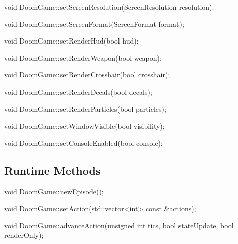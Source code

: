 \documentclass[english,bachelor,a4paper,twoside]{ppfcmthesis}
\begin{document}
\begin{clinee}
void DoomGame::setScreenResolution(ScreenResolution resolution);
\end{clinee}


\begin{clinee}
void DoomGame::setScreenFormat(ScreenFormat format);
\end{clinee}
	

\begin{clinee}       
void DoomGame::setRenderHud(bool hud);
\end{clinee}


\begin{clinee}  
void DoomGame::setRenderWeapon(bool weapon);
\end{clinee}


\begin{clinee}  
void DoomGame::setRenderCrosshair(bool crosshair);
\end{clinee}


\begin{clinee}  
void DoomGame::setRenderDecals(bool decals);
\end{clinee}


\begin{clinee}  
void DoomGame::setRenderParticles(bool particles);
\end{clinee}


\begin{clinee}
void DoomGame::setWindowVisible(bool visibility);
\end{clinee}


\begin{clinee}
void DoomGame::setConsoleEnabled(bool console);
\end{clinee}
	

\subsection{Runtime Methods}\label{subsec:runtime_methods}
	

\begin{clinee}
void DoomGame::newEpisode();
\end{clinee}


\begin{clinee}
	void DoomGame::setAction(std::vector<int> const &actions);
\end{clinee}


\begin{clinee}
	void DoomGame::advanceAction(unsigned int tics, bool stateUpdate, bool renderOnly);
\end{clinee}
\end{document}
